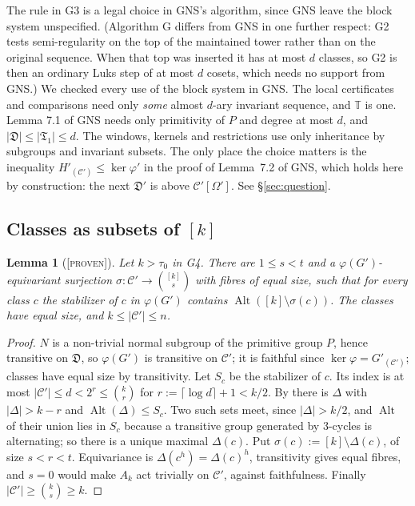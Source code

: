 \documentclass[11pt]{article}
\newtheorem{lemma}[theorem]{Lemma}
\theoremstyle{definition}
\theoremstyle{remark}
\newcommand{\Alt}{\operatorname{Alt}}
\newcommand{\C}{\mathcal C}
\newcommand{\T}{\mathbb T}
\newcommand{\fT}{\mathfrak T}
\newcommand{\fD}{\mathfrak D}
\newcommand{\Proven}{\textsc{[proven]}}
\begin{document}
The rule in G3 is a legal choice in GNS's algorithm, since GNS leave the block system unspecified. (Algorithm G differs from GNS in one further respect: G2 tests semi-regularity on the top of the maintained tower rather than on the original sequence. When that top was inserted it has at most $d$ classes, so G2 is then an ordinary Luks step of at most $d$ cosets, which needs no support from GNS.) We checked every use of the block system in GNS. The local certificates and comparisons need only \emph{some} almost $d$-ary invariant sequence, and $\T$ is one. Lemma 7.1 of GNS needs only primitivity of $P$ and degree at most $d$, and $|\fD|\le|\fT_1|\le d$. The windows, kernels and restrictions use only inheritance by subgroups and invariant subsets. The only place the choice matters is the inequality $H'_{(\C')}\le\ker\varphi'$ in the proof of Lemma~7.2 of GNS, which holds here by construction: the next $\fD'$ is above $\C'[\Omega']$. See \S\ref{sec:question}.

\subsection{Classes as subsets of $[k]$}

\begin{lemma}[\Proven]\label{lem:subset}
Let $k>\tau_0$ in \textup{G4}. There are $1\le s<t$ and a $\varphi(G')$-equivariant surjection $\sigma\colon\C'\to\binom{[k]}{s}$ with fibres of equal size, such that for every class $c$ the stabilizer of $c$ in $\varphi(G')$ contains $\Alt([k]\setminus\sigma(c))$. The classes have equal size, and $k\le|\C'|\le n$.
\end{lemma}
\begin{proof}
$N$ is a non-trivial normal subgroup of the primitive group $P$, hence transitive on $\fD$, so $\varphi(G')$ is transitive on $\C'$; it is faithful since $\ker\varphi=G'_{(\C')}$; classes have equal size by transitivity. Let $S_c$ be the stabilizer of $c$. Its index is at most $|\C'|\le d<2^{r}\le\binom kr$ for $r:=\lceil\log d\rceil+1<k/2$. By \cite[Thm~6.4]{GNS} there is $\Delta$ with $|\Delta|>k-r$ and $\Alt(\Delta)\le S_c$. Two such sets meet, since $|\Delta|>k/2$, and $\Alt$ of their union lies in $S_c$ because a transitive group generated by $3$-cycles is alternating; so there is a unique maximal $\Delta(c)$. Put $\sigma(c):=[k]\setminus\Delta(c)$, of size $s<r<t$. Equivariance is $\Delta(c^h)=\Delta(c)^h$, transitivity gives equal fibres, and $s=0$ would make $A_k$ act trivially on $\C'$, against faithfulness. Finally $|\C'|\ge\binom ks\ge k$.
\end{proof}
\end{document}
